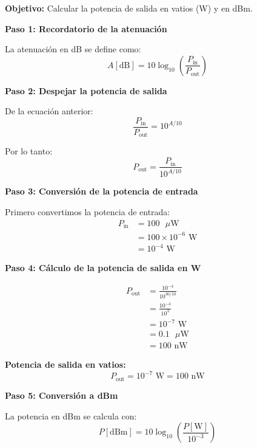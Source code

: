 \documentclass[11pt,a4paper]{article}
\begin{document}
\textbf{Objetivo:} Calcular la potencia de salida en vatios (W) y en dBm.

\textbf{Paso 1: Recordatorio de la atenuación}

La atenuación en dB se define como:
\begin{equation}
    A[\text{dB}] = 10\log_{10}\left(\frac{P_{\text{in}}}{P_{\text{out}}}\right)
\end{equation}

\textbf{Paso 2: Despejar la potencia de salida}

De la ecuación anterior:
\begin{equation}
    \frac{P_{\text{in}}}{P_{\text{out}}} = 10^{A/10}
\end{equation}

Por lo tanto:
\begin{equation}
    P_{\text{out}} = \frac{P_{\text{in}}}{10^{A/10}}
\end{equation}

\textbf{Paso 3: Conversión de la potencia de entrada}

Primero convertimos la potencia de entrada:
\begin{align}
    P_{\text{in}} &= 100 \text{ }\mu\text{W} \\
    &= 100 \times 10^{-6} \text{ W} \\
    &= 10^{-4} \text{ W}
\end{align}

\textbf{Paso 4: Cálculo de la potencia de salida en W}

\begin{align}
    P_{\text{out}} &= \frac{10^{-4}}{10^{30/10}} \\
    &= \frac{10^{-4}}{10^3} \\
    &= 10^{-7} \text{ W} \\
    &= 0.1 \text{ }\mu\text{W} \\
    &= 100 \text{ nW}
\end{align}

\textbf{Potencia de salida en vatios:}
\begin{equation}
    P_{\text{out}} = 10^{-7} \text{ W} = 100 \text{ nW}
\end{equation}

\textbf{Paso 5: Conversión a dBm}

La potencia en dBm se calcula con:
\begin{equation}
    P[\text{dBm}] = 10\log_{10}\left(\frac{P[\text{W}]}{10^{-3}}\right)
\end{equation}
\end{document}
